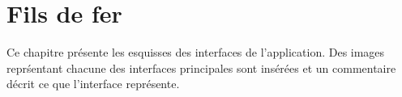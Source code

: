 
\chapter{Fils de fer}
\label{s:fil_fer}

Ce chapitre pr\'esente les esquisses des interfaces de l'application.
Des images repr\'sentant chacune des interfaces principales sont ins\'er\'ees et un commentaire décrit ce que l'interface repr\'esente.
